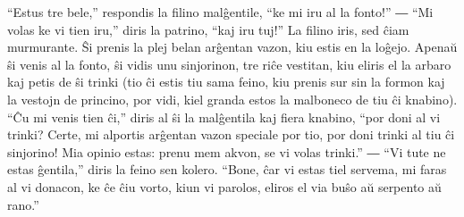 
“Estus tre bele,” respondis la filino malĝentile, “ke mi iru al la fonto!” ― “Mi volas\unuakomon{} ke vi tien iru,” diris la patrino, “kaj iru tuj!” La filino iris, sed ĉiam murmurante. Ŝi prenis la plej belan arĝentan vazon, kiu estis en la loĝejo. Apenaŭ ŝi venis al la fonto, ŝi vidis unu sinjorinon, tre riĉe vestitan, kiu eliris el la arbaro kaj petis de ŝi trinki (tio ĉi estis tiu sama feino, kiu prenis sur sin la formon kaj la vestojn de princino, por vidi, kiel granda estos la malboneco de tiu ĉi knabino). “Ĉu mi venis tien ĉi,” diris al ŝi la malĝentila kaj fiera knabino, “por doni al vi trinki? Certe, mi alportis arĝentan vazon speciale por tio, por doni trinki al tiu ĉi sinjorino! Mia opinio estas: prenu mem akvon, se vi volas trinki.” ― “Vi tute ne estas ĝentila,” diris la feino sen kolero. “Bone, ĉar vi estas tiel servema, mi faras al vi donacon, ke ĉe ĉiu vorto, kiun vi parolos, eliros el via buŝo aŭ serpento aŭ rano.”

